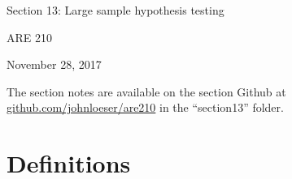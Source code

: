 \documentclass[12pt,english]{article}
\begin{document}
\begin{center}
{\Large{}Section 13: Large sample hypothesis testing}
\par\end{center}{\Large \par}

\begin{center}
ARE 210
\par\end{center}

\begin{center}
November 28, 2017
\par\end{center}

The section notes are available on the section Github at \href{github.com/johnloeser/are210}{github.com/johnloeser/are210} in the ``section13'' folder.

\section{Definitions}
\end{document}
